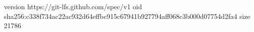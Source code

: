 version https://git-lfs.github.com/spec/v1
oid sha256:c338f734ac22ac932d64effbc915c67941b927794aff068c3b000d07754d2fa4
size 21786
